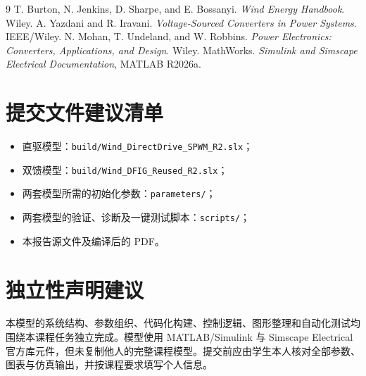 \documentclass[UTF8,zihao=-4,fontset=none]{ctexrep}
\begin{document}
\begin{thebibliography}{9}
 T. Burton, N. Jenkins, D. Sharpe, and E. Bossanyi. \textit{Wind Energy Handbook}. Wiley.
 A. Yazdani and R. Iravani. \textit{Voltage-Sourced Converters in Power Systems}. IEEE/Wiley.
 N. Mohan, T. Undeland, and W. Robbins. \textit{Power Electronics: Converters, Applications, and Design}. Wiley.
 MathWorks. \textit{Simulink and Simscape Electrical Documentation}, MATLAB R2026a.
\end{thebibliography}

\appendix
\chapter{提交文件建议清单}
\begin{itemize}
  \item 直驱模型：\texttt{build/Wind\_DirectDrive\_SPWM\_R2.slx}；
  \item 双馈模型：\texttt{build/Wind\_DFIG\_Reused\_R2.slx}；
  \item 两套模型所需的初始化参数：\texttt{parameters/}；
  \item 两套模型的验证、诊断及一键测试脚本：\texttt{scripts/}；
  \item 本报告源文件及编译后的 PDF。
\end{itemize}

\chapter{独立性声明建议}
本模型的系统结构、参数组织、代码化构建、控制逻辑、图形整理和自动化测试均围绕本课程任务独立完成。模型使用 MATLAB/Simulink 与 Simscape Electrical 官方库元件，但未复制他人的完整课程模型。提交前应由学生本人核对全部参数、图表与仿真输出，并按课程要求填写个人信息。
\end{document}
